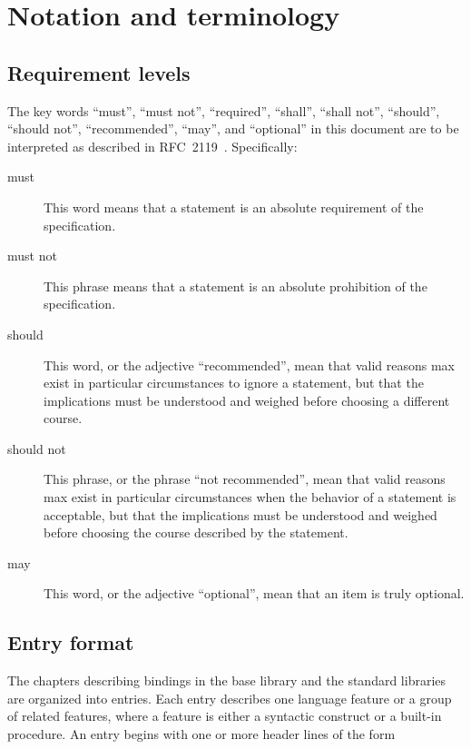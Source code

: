 \chapter{Notation and terminology}
\label{terminologychapter}

\section{Requirement levels} 
\label{requirementsection}

The key words ``must'', ``must not'', ``required'', ``shall'', ``shall
not'', ``should'', ``should not'', ``recommended'', ``may'', and
``optional'' in this document are to be interpreted as described in
RFC~2119~\cite{mustard}.  Specifically:

\begin{description}
\item[must] This word means that a statement is an absolute
  requirement of the specification.
\item[must not] This phrase means that a statement is an absolute
  prohibition of the specification.
\item[should] This word, or the adjective ``recommended'', mean that
  valid reasons max exist in particular circumstances to ignore a
  statement, but that the implications must be understood and weighed
  before choosing a different course.
\item[should not] This phrase, or the phrase ``not recommended'', mean
  that valid reasons max exist in particular circumstances when the
  behavior of a statement is acceptable, but that the implications
  must be understood and weighed before choosing the course described
  by the statement.
\item[may] This word, or the adjective ``optional'', mean that an item
  is truly optional.
\end{description}


\section{Entry format}

The chapters describing bindings in the base library and the standard
libraries are organized
into entries.  Each entry describes one language feature or a group of
related features, where a feature is either a syntactic construct or a
built-in procedure.  An entry begins with one or more header lines of the form

\noindent{}\unpenalty


